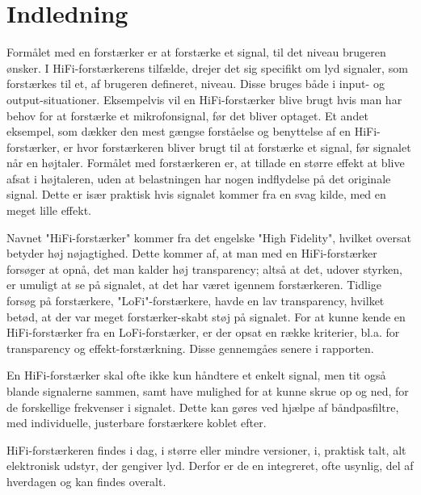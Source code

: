 \chapter{Indledning}
\label{indledning}
Formålet med en forstærker er at forstærke et signal, til det niveau brugeren ønsker. I HiFi-forstærkerens tilfælde, drejer det sig specifikt om lyd signaler, som forstærkes til et, af brugeren defineret, niveau. Disse bruges både i input- og output-situationer. Eksempelvis vil en HiFi-forstærker blive brugt hvis man har behov for at forstærke et mikrofonsignal, før det bliver optaget. Et andet eksempel, som dækker den mest gængse forståelse og benyttelse af en HiFi-forstærker, er hvor forstærkeren bliver brugt til at forstærke et signal, før signalet når en højtaler. Formålet med forstærkeren er, at tillade en større effekt at blive afsat i højtaleren, uden at belastningen har nogen indflydelse på det originale signal. Dette er især praktisk hvis signalet kommer fra en svag kilde, med en meget lille effekt.

Navnet "HiFi-forstærker" kommer fra det engelske "High Fidelity", hvilket oversat betyder høj nøjagtighed. Dette kommer af, at man med en HiFi-forstærker forsøger at opnå, det man kalder høj transparency; altså at det, udover styrken, er umuligt at se på signalet, at det har været igennem forstærkeren. Tidlige forsøg på forstærkere, "LoFi"-forstærkere, havde en lav transparency, hvilket betød, at der var meget forstærker-skabt støj på signalet. For at kunne kende en HiFi-forstærker fra en LoFi-forstærker, er der opsat en række kriterier, bl.a. for transparency og effekt-forstærkning. Disse gennemgåes senere i rapporten.

En HiFi-forstærker skal ofte ikke kun håndtere et enkelt signal, men tit også blande signalerne sammen, samt have mulighed for at kunne skrue op og ned, for de forskellige frekvenser i signalet. Dette kan gøres ved hjælpe af båndpasfiltre, med individuelle, justerbare forstærkere koblet efter.

HiFi-forstærkeren findes i dag, i større eller mindre versioner, i, praktisk talt, alt elektronisk udstyr, der gengiver lyd. Derfor er de en integreret, ofte usynlig, del af hverdagen og kan findes overalt.